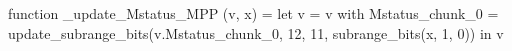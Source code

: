 function _update_Mstatus_MPP (v, x) = let v = { v with Mstatus_chunk_0 = update_subrange_bits(v.Mstatus_chunk_0, 12, 11, subrange_bits(x, 1, 0)) } in
  v
